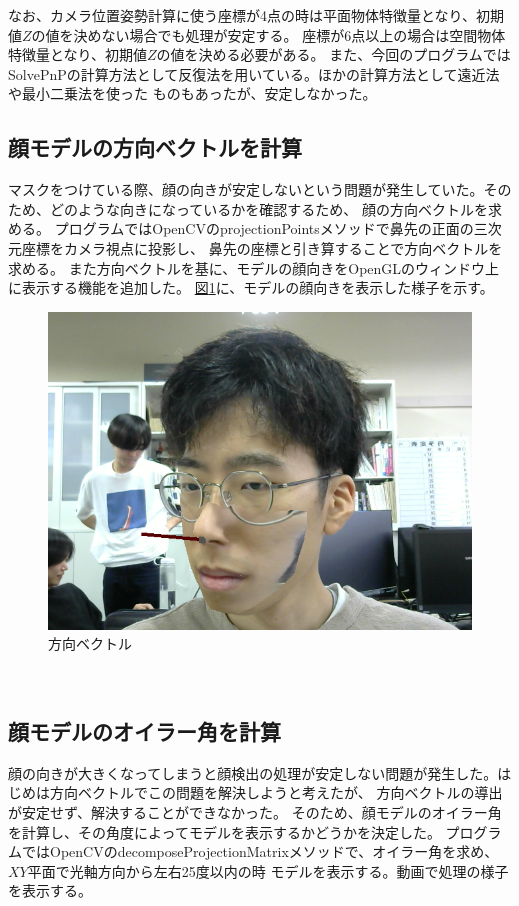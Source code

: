 \documentclass[]{jarticle}          %
\begin{document}
なお、カメラ位置姿勢計算に使う座標が4点の時は平面物体特徴量となり、初期値$Z$の値を決めない場合でも処理が安定する。
座標が6点以上の場合は空間物体特徴量となり、初期値$Z$の値を決める必要がある。
また、今回のプログラムではSolvePnPの計算方法として反復法を用いている。ほかの計算方法として遠近法や最小二乗法を使った
ものもあったが、安定しなかった。

\subsection{顔モデルの方向ベクトルを計算}
マスクをつけている際、顔の向きが安定しないという問題が発生していた。そのため、どのような向きになっているかを確認するため、
顔の方向ベクトルを求める。
プログラムではOpenCVのprojectionPointsメソッドで鼻先の正面の三次元座標をカメラ視点に投影し、
鼻先の座標と引き算することで方向ベクトルを求める。
また方向ベクトルを基に、モデルの顔向きをOpenGLのウィンドウ上に表示する機能を追加した。
\hyperref[six]{図\ref{six}}に、モデルの顔向きを表示した様子を示す。
\begin{figure}[!ht]
  \begin{center}
    \includegraphics[scale=0.5]{figures/5.png}
    \caption{方向ベクトル}
    \label{six}
  \end{center}
\end{figure}
\\
\subsection{顔モデルのオイラー角を計算}
顔の向きが大きくなってしまうと顔検出の処理が安定しない問題が発生した。はじめは方向ベクトルでこの問題を解決しようと考えたが、
方向ベクトルの導出が安定せず、解決することができなかった。
そのため、顔モデルのオイラー角を計算し、その角度によってモデルを表示するかどうかを決定した。
プログラムではOpenCVのdecomposeProjectionMatrixメソッドで、オイラー角を求め、$XY$平面で光軸方向から左右25度以内の時
モデルを表示する。動画で処理の様子を表示する。\\
\newpage
\end{document}
